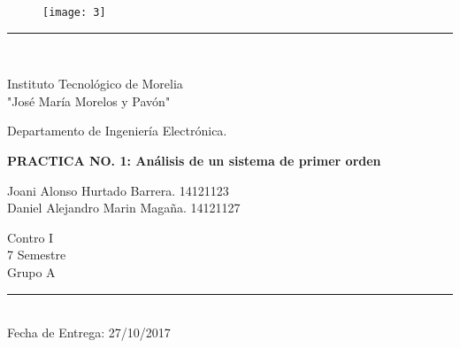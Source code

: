 \documentclass[12pt]{article}
\begin{document}
		\begin{titlepage}
		\begin{center}
			\vspace*{0in}
			\begin{figure}[htb]
				\begin{center}
					\texttt{[image: 3]}
				\end{center}
			\end{figure}
			\rule{100mm}{0.1mm}\\
			\begin{Large}
				Instituto Tecnológico de Morelia\\
				"José María Morelos y Pavón"\\
			\end{Large}
			\vspace*{0.15in}
			\begin{Large}
				Departamento de Ingeniería Electrónica.\\
			\end{Large}
			\vspace*{0.4in}
			
			\begin{Large}
				\textbf{PRACTICA NO. 1: Análisis de un sistema de primer orden} \\
			\end{Large}
			\vspace*{0.3in}
			\begin{Large}
				Joani Alonso Hurtado Barrera. 14121123\\
				Daniel Alejandro Marin Magaña. 14121127\\
			\end{Large}
			\vspace*{0.1in}
			\begin{Large}
				Contro I\\
				7 Semestre\\
				Grupo A\\
				\rule{80mm}{0.1mm}\\
				Fecha de Entrega: 27/10/2017\\
			\end{Large}
			\vspace*{0.1in}
		\end{center}		
	\end{titlepage}
\end{document}
